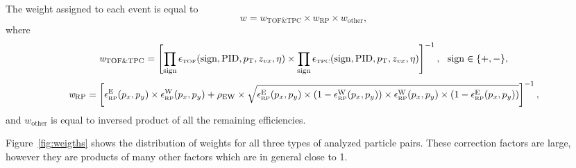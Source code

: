 


The weight assigned to each event is equal to
\begin{equation}\label{eq:weight}
	\mathit{w} = \mathit{w}_{\text{TOF\&TPC}}\times \mathit{w}_{\text{RP}}\times \mathit{w}_{\text{other}},
\end{equation}
where
\begin{equation}
	\mathit{w}_{\text{TOF\&TPC}} = \left[\prod\limits_{\textrm{sign}} \epsilon_{\textrm{\tiny TOF}}(\textrm{sign}, \textrm{PID}, p_{\text{T}},z_{vx},\eta)  \times \prod\limits_{\textrm{sign}} \epsilon_{\textrm{\tiny TPC}}(\textrm{sign}, \textrm{PID}, p_{\text{T}},z_{vx},\eta)\right]^{-1},~~\textrm{sign}\in\{+,-\},
\end{equation}
\begin{equation}\label{eq:weight}
	\mathit{w}_{\text{RP}} = \left[ \epsilon_{\textrm{\tiny RP}}^{\textrm{E}}(p_{x},p_{y})\times\epsilon_{\textrm{\tiny RP}}^{\textrm{W}}(p_{x},p_{y}) + \rho_{\text{EW}}\times\sqrt{\epsilon_{\textrm{\tiny RP}}^{\textrm{E}}(p_{x},p_{y})\times\left(1-\epsilon_{\textrm{\tiny RP}}^{\textrm{W}}(p_{x},p_{y})\right)\times\epsilon_{\textrm{\tiny RP}}^{\textrm{W}}(p_{x},p_{y})\times\left(1-\epsilon_{\textrm{\tiny RP}}^{\textrm{E}}(p_{x},p_{y})\right)} \right]^{-1},
\end{equation}
and $\mathit{w}_{\text{other}}$ is equal to inversed product of all the remaining efficiencies.

Figure~\ref{fig:weigths} shows the distribution of weights for all three types of analyzed particle pairs. These correction factors are large,  however they are products of many other factors which are in general close to 1.

